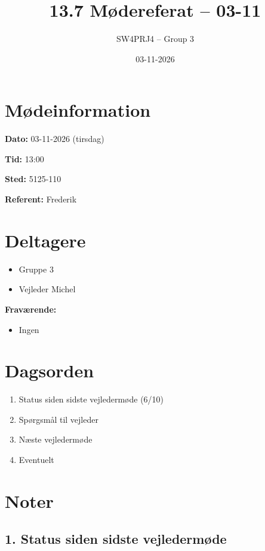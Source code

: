 \documentclass[a4paper,11pt]{article}
\title{13.7 Mødereferat -- 03-11}
\author{SW4PRJ4 -- Group 3}
\date{03-11-2026}
\begin{document}
\maketitle

\section*{Mødeinformation}

\textbf{Dato:} 03-11-2026 (tirsdag)

\textbf{Tid:} 13:00

\textbf{Sted:} 5125-110

\textbf{Referent:} Frederik

\section*{Deltagere}

\begin{itemize}
    \item Gruppe 3
    \item Vejleder Michel
\end{itemize}

\textbf{Fraværende:}

\begin{itemize}
    \item Ingen
\end{itemize}

\section*{Dagsorden}

\begin{enumerate}
    \item Status siden sidste vejledermøde (6/10)
    \item Spørgsmål til vejleder
    \item Næste vejledermøde
    \item Eventuelt
\end{enumerate}

\section*{Noter}

\subsection*{1. Status siden sidste vejledermøde}
\end{document}

